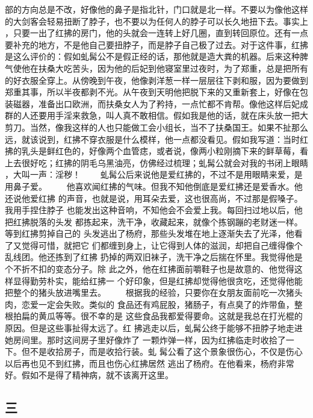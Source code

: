 部的方向总是不改，好像他的鼻子是指北针，门口就是北一样。不要以为像他这样 的大剑客会轻易扭断了脖子，也不要以为任何人的脖子可以长久地扭下去。事实上 ，只要一出了红拂的房门，他的头就会一连转上好几圈，直到转回原位。还有一点 要补充的地方，不是他自己要扭脖子，而是脖子自己极了过去。对于这件事，红拂 是这么评价的：假如虬髯公不是假正经的话，那他就是造大粪的机器。后来这种脾 气使他在扶桑大吃苦头，因为他的后妃到他寝室里过夜时，为了郑重，总是把所有 的好衣服全穿上。从傍晚到午夜，他像剥洋葱一样一层层往下剥和服，因为要做到 郑重其事，所以半夜都剥不光。从午夜到天明他把脱下来的又重新套上，好像在包 装磁器，准备出口欧洲，而扶桑女人为了矜持，一点忙都不肯帮。像他这样后妃成 群的人还要用手淫来救急，叫人真不敢相信。假如我是他的话，就在床头放一把大 剪刀。当然，像我这样的人也只能做工会小组长，当不了扶桑国王。如果不扯那么 远，就该说到，红拂不穿衣服是什么模样，他一点都没看见。假如我写道：当时红 拂的乳头是鲜红色的，好像两个血管痣，或者说，像两小粒刚摘下来的鲜草莓，看 上去很好吃；红拂的阴毛乌黑油亮，仿佛经过梳理；虬髯公就会对我的书闭上眼睛 ，大叫一声：淫秽！ 　　虬髯公后来说他是爱红拂的，不过不是用眼睛来爱，是用鼻子爱。 　　他喜欢闻红拂的气味。但我不知他倒底是爱红拂还是爱香水。他还说他爱红拂 的声音，也就是说，用耳朵去爱，这也很高尚，不过那是假嗓子。我用手捏住脖子 也能发出这种音响，不知他会不会爱上我。每回扫过地以后，他把红拂脱落的头发 都拣起来，洗干净，收藏起来，就像个拣钢蹦的老财迷一样。等到红拂剪掉自己的 头发逃出了杨府，那些头发堆在地上逐渐失去了光泽，他看了又觉得可惜，就把它 们都缠到身上，让它得到人体的滋润，却把自己缠得像个乱线团。他还拣到了红拂 扔掉的两双旧袜子，洗干净之后揣在怀里。我觉得他是个不折不扣的变态分子。除 此之外，他在红拂面前嚼鞋子也是故意的、他觉得这样显得勤劳朴实，能给红拂一 个好印象，但是红拂却觉得他很贪吃，还觉得他能把整个的猪头放进嘴里去。 　　根据我的经验，只要你在女朋友面前吃一次猪头肉，恋爱一定会失败。类似的 食品还有鸡屁股，猪肠子，有点臭了的炸带鱼，整根拍扁的黄瓜等等。很不幸的是 这些食品我都爱得要命。这就是我总在打光棍的原因。但是这些事扯得太远了。红 拂逃走以后，虬髯公终于能够不扭脖子地走进她房间里。那时这间房子里好像炸了 一颗炸弹一样，因为红拂临走时收拾了一下。但不是收拾房子，而是收拾行装。虬 髯公看了这个景象很伤心，不仅是伤心以后再也见不到红拂，而且也伤心红拂居然 逃出了杨府。在他看来，杨府非常好。假如不是得了精神病，就不该离开这里。 
 
 
\subsection{三} 
 
